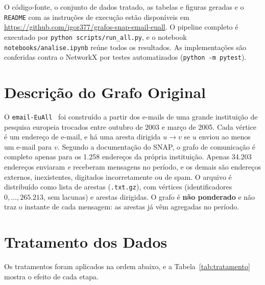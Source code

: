 \documentclass[sigconf]{webmedia}
\begin{document}
O código-fonte, o conjunto de dados tratado, as tabelas e figuras geradas e o
\texttt{README} com as instruções de execução estão disponíveis em
\url{https://github.com/igor377/grafos-snap-email-euall}. O pipeline completo é executado
por \texttt{python scripts/run\_all.py}, e o notebook \texttt{notebooks/analise.ipynb}
reúne todos os resultados. As implementações são conferidas contra o NetworkX por
\nTestes{} testes automatizados (\texttt{python -m pytest}).

\section{Descrição do Grafo Original}
\label{sec:grafo}

O \texttt{email-EuAll}~\cite{leskovec2007,snapnets} foi construído a partir dos e-mails
de uma grande instituição de pesquisa europeia trocados entre outubro de 2003 e março de
2005. Cada vértice é um endereço de e-mail, e há uma aresta dirigida $u \rightarrow v$ se
$u$ enviou ao menos um e-mail para $v$. Segundo a documentação do SNAP, o grafo de
comunicação é completo apenas para os 1.258 endereços da própria instituição. Apenas
34.203 endereços enviaram \emph{e} receberam mensagens no período, e os demais são
endereços externos, inexistentes, digitados incorretamente ou de spam. O arquivo é distribuído
como lista de arestas (\texttt{.txt.gz}), com \nVBruto{} vértices (identificadores
$0,\dots,265.213$, sem lacunas) e \nEBruto{} arestas dirigidas. O grafo é \textbf{não
ponderado} e não traz o instante de cada mensagem: as arestas já vêm agregadas no
período.

\section{Tratamento dos Dados}
\label{sec:tratamento}

Os tratamentos foram aplicados na ordem abaixo, e a Tabela~\ref{tab:tratamento} mostra
o efeito de cada etapa.
\end{document}
